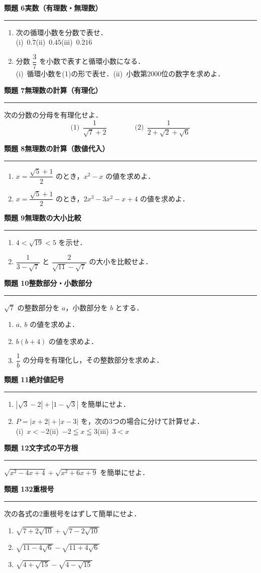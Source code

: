 \documentclass[a4paper,11pt]{ltjsarticle}
\newcommand{\mon}[2]{\Needspace{7\baselineskip}\vspace{10pt}%
  {\sffamily\bfseries 類題 #1\quad #2\par}\vspace{2pt}\hrule\vspace{4pt}}
\newcommand{\rpt}[1]{0.\dot{#1}}
\begin{document}
\mon{6}{実数（有理数・無理数）}
\begin{enumerate}
\item 次の循環小数を分数で表せ．\\
(i)\ $\rpt7$\qquad (ii)\ $0.\dot4\dot5$\qquad (iii)\ $0.\dot21\dot6$
\item 分数 $\dfrac37$ を小数で表すと循環小数になる．\\
(i)\ 循環小数を(1)の形で表せ．\qquad (ii)\ 小数第2000位の数字を求めよ．
\end{enumerate}

\mon{7}{無理数の計算（有理化）}
次の分数の分母を有理化せよ．
\[\text{(1)}\ \ \frac{1}{\sqrt7+2}\qquad\qquad \text{(2)}\ \ \frac{1}{2+\sqrt2+\sqrt6}\]

\mon{8}{無理数の計算（数値代入）}
\begin{enumerate}
\item $x=\dfrac{\sqrt5+1}{2}$ のとき，$x^2-x$ の値を求めよ．
\item $x=\dfrac{\sqrt5+1}{2}$ のとき，$2x^3-3x^2-x+4$ の値を求めよ．
\end{enumerate}

\mon{9}{無理数の大小比較}
\begin{enumerate}
\item $4<\sqrt{19}<5$ を示せ．
\item $\dfrac{1}{3-\sqrt7}$ と $\dfrac{2}{\sqrt{11}-\sqrt7}$ の大小を比較せよ．
\end{enumerate}

\mon{10}{整数部分・小数部分}
$\sqrt7$ の整数部分を $a$，小数部分を $b$ とする．
\begin{enumerate}
\item $a,\ b$ の値を求めよ．
\item $b(b+4)$ の値を求めよ．
\item $\dfrac1b$ の分母を有理化し，その整数部分を求めよ．
\end{enumerate}

\mon{11}{絶対値記号}
\begin{enumerate}
\item $|\sqrt3-2|+|1-\sqrt3|$ を簡単にせよ．
\item $P=|x+2|+|x-3|$ を，次の3つの場合に分けて計算せよ．\\
(i)\ $x<-2$\qquad (ii)\ $-2\leqq x\leqq3$\qquad (iii)\ $3<x$
\end{enumerate}

\mon{12}{文字式の平方根}
$\sqrt{x^2-4x+4}+\sqrt{x^2+6x+9}$ を簡単にせよ．

\mon{13}{2重根号}
次の各式の2重根号をはずして簡単にせよ．
\begin{enumerate}
\item $\sqrt{7+2\sqrt{10}}+\sqrt{7-2\sqrt{10}}$
\item $\sqrt{11-4\sqrt6}-\sqrt{11+4\sqrt6}$
\item $\sqrt{4+\sqrt{15}}-\sqrt{4-\sqrt{15}}$
\end{enumerate}
\end{document}
